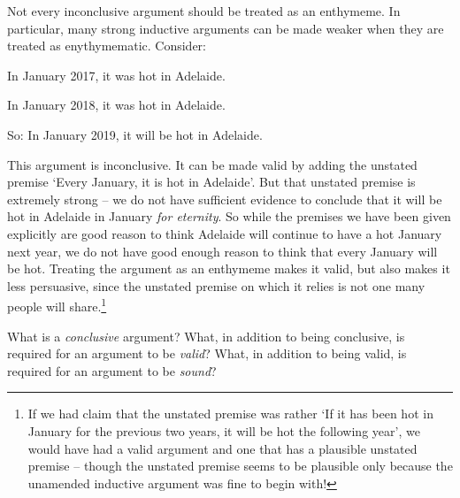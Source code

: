 	Not every inconclusive argument should be treated as an enthymeme. In particular, many strong inductive arguments can be made weaker when they are treated as enythymematic. Consider:
	\begin{earg}
		\item[] In January 2017, it was hot in Adelaide.
		\item[] In January 2018, it was hot in Adelaide.
	\item[So:] In January 2019, it will be hot in Adelaide.
\end{earg} This argument is inconclusive. It can be made valid by adding the unstated premise `Every January, it is hot in Adelaide'. But that unstated premise is extremely strong – we do not have sufficient evidence to conclude that it will be hot in Adelaide in January \emph{for eternity}. So while the premises we have been given explicitly are good reason to think Adelaide will continue to have a hot January next year, we do not have good enough reason to think that every January will be hot. Treating the argument as an enthymeme makes it valid, but also makes it less persuasive, since the unstated premise on which it relies is not one many people will share.\footnote{If we had claim that the unstated premise was rather `If it has been hot in January for the previous two years, it will be hot the following year', we would have had a valid argument and one that has a plausible unstated premise – though the unstated premise seems to be plausible only because the unamended inductive argument was fine to begin with!}


\practiceproblems
\problempart
What is a \emph{conclusive} argument? What, in addition to being conclusive, is required for an argument to be \emph{valid}? What, in addition to being valid, is required for an argument to be \emph{sound}?

